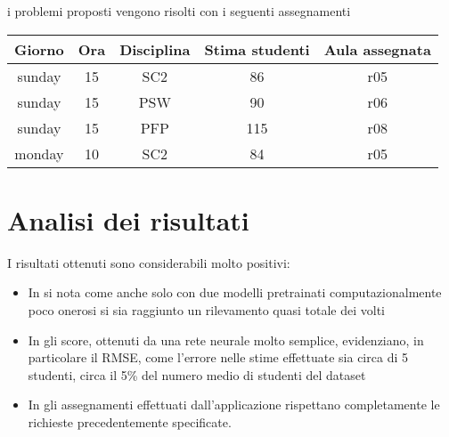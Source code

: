 \noindent
i problemi proposti vengono risolti con i seguenti assegnamenti

\begin{table}[h]
    \begin{small}
        \begin{center}
            \begin{tabular}[c]{c|c|c|c|c}
                Giorno & Ora & Disciplina & Stima studenti & Aula assegnata \\
                \hline
                sunday & 15 & SC2 & 86 & r05 \\
                sunday & 15 & PSW & 90 & r06 \\
                sunday & 15 & PFP & 115 & r08 \\
                monday & 10 & SC2 & 84 & r05
            \end{tabular}
        \end{center}
    \end{small}
\end{table}

\section{Analisi dei risultati}

I risultati ottenuti sono considerabili molto positivi:

\begin{itemize}
    \item In  si nota come anche solo con due modelli pretrainati
        computazionalmente poco onerosi si sia raggiunto un rilevamento quasi totale dei volti
    \item In  gli score, ottenuti da una rete neurale molto semplice,
        evidenziano, in particolare il RMSE, come l'errore nelle stime effettuate sia circa 
        di 5 studenti, circa il 5\% del numero medio di studenti del dataset
    \item In  gli assegnamenti effettuati dall'applicazione rispettano
        completamente le richieste precedentemente specificate.
\end{itemize}
